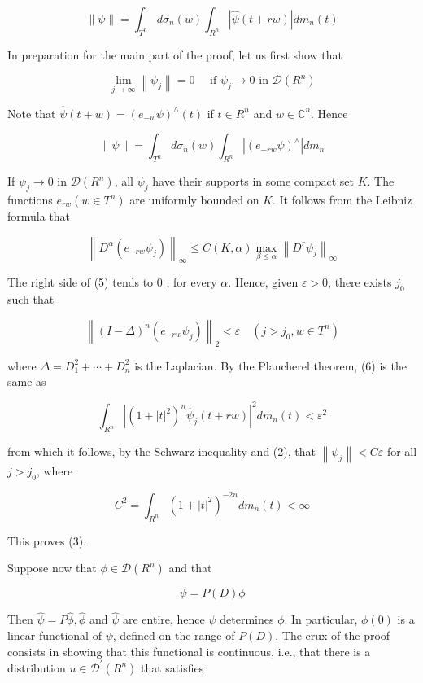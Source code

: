 \documentclass[10pt]{article}
\begin{document}
$$
\|\psi\|=\int_{T^{n}} d \sigma_{n}(w) \int_{R^{n}}|\hat{\psi}(t+r w)| d m_{n}(t)
$$

In preparation for the main part of the proof, let us first show that

$$
\lim _{j \rightarrow \infty}\left\|\psi_{j}\right\|=0 \quad \text { if } \psi_{j} \rightarrow 0 \text { in } \mathscr{D}\left(R^{n}\right)
$$

Note that $\hat{\psi}(t+w)=\left(e_{-w} \psi\right)^{\wedge}(t)$ if $t \in R^{n}$ and $w \in \mathbb{C}^{n}$. Hence

$$
\|\psi\|=\int_{T^{n}} d \sigma_{n}(w) \int_{R^{n}}\left|\left(e_{-r w} \psi\right)^{\wedge}\right| d m_{n}
$$

If $\psi_{j} \rightarrow 0$ in $\mathscr{D}\left(R^{n}\right)$, all $\psi_{j}$ have their supports in some compact set $K$. The functions $e_{r w}\left(w \in T^{n}\right)$ are uniformly bounded on $K$. It follows from the Leibniz formula that

$$
\left\|D^{\alpha}\left(e_{-r w} \psi_{j}\right)\right\|_{\infty} \leq C(K, \alpha) \max _{\beta \leq \alpha}\left\|D^{r} \psi_{j}\right\|_{\infty}
$$

The right side of (5) tends to 0 , for every $\alpha$. Hence, given $\varepsilon>0$, there exists $j_{0}$ such that

$$
\left\|(I-\Delta)^{n}\left(e_{-r w} \psi_{j}\right)\right\|_{2}<\varepsilon \quad\left(j>j_{0}, w \in T^{n}\right)
$$

where $\Delta=D_{1}^{2}+\cdots+D_{n}^{2}$ is the Laplacian. By the Plancherel theorem, (6) is the same as

$$
\int_{R^{n}}\left|\left(1+|t|^{2}\right)^{n} \hat{\psi}_{j}(t+r w)\right|^{2} d m_{n}(t)<\varepsilon^{2}
$$

from which it follows, by the Schwarz inequality and (2), that $\left\|\psi_{j}\right\|<C \varepsilon$ for all $j>j_{0}$, where

$$
C^{2}=\int_{R^{n}}\left(1+|t|^{2}\right)^{-2 n} d m_{n}(t)<\infty
$$

This proves (3).

Suppose now that $\phi \in \mathscr{D}\left(R^{n}\right)$ and that

$$
\psi=P(D) \phi
$$

Then $\hat{\psi}=P \hat{\phi}, \hat{\phi}$ and $\hat{\psi}$ are entire, hence $\psi$ determines $\phi$. In particular, $\phi(0)$ is a linear functional of $\psi$, defined on the range of $P(D)$. The crux of the proof
consists in showing that this functional is continuous, i.e., that there is a distribution $u \in \mathscr{D}^{\prime}\left(R^{n}\right)$ that satisfies
\end{document}
